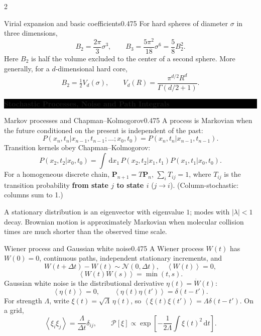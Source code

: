 \documentclass[8pt,a4paper]{extarticle}
\newcommand{\sectionbanner}[1]{%
  \par
  \Needspace{8\baselineskip}%
  \vspace{0.4ex}%
  \noindent
  \colorbox{black}{%
    \parbox{\dimexpr\linewidth-2\fboxsep\relax}{%
      \centering\color{white}\bfseries\footnotesize #1%
    }%
  }%
  \par\vspace{0.3ex}%
  \nopagebreak
}
\newcommand{\dd}{\,\mathrm d}
\newcommand{\avg}[1]{\left\langle #1\right\rangle}
\begin{document}
\begin{multicols*}{2}
\begin{mytikzbox}{Virial expansion and basic coefficients}{0.475}
For hard spheres of diameter \(\sigma\) in three dimensions, \[ B_2=\frac{2\pi}{3}\sigma^3, \qquad B_3=\frac{5\pi^2}{18}\sigma^6=\frac58B_2^2. \] Here \(B_2\) is half the volume excluded to the center of a second sphere. More generally, for a \(d\)-dimensional hard core, \[ B_2=\tfrac12V_d(\sigma), \qquad V_d(R)=\frac{\pi^{d/2}R^d}{\Gamma(d/2+1)}. \]
\end{mytikzbox}


\sectionbanner{Stochastic Processes, Noise and Path Integrals}
\begin{mytikzbox}{Markov processes and Chapman--Kolmogorov}{0.475}
A process is Markovian when the future conditioned on the present is independent
of the past:
\[
P(x_n,t_n|x_{n-1},t_{n-1};\ldots;x_0,t_0)
=P(x_n,t_n|x_{n-1},t_{n-1}).
\]
Transition kernels obey Chapman--Kolmogorov:
\[
P(x_2,t_2|x_0,t_0)=\int\dd x_1\,
P(x_2,t_2|x_1,t_1)P(x_1,t_1|x_0,t_0).
\]
For a homogeneous discrete chain, $\bm P_{n+1}=T\bm P_n$,
$\sum_iT_{ij}=1$, where $T_{ij}$ is the transition probability
\textbf{from state $j$ to state $i$} ($j\to i$).
(Column-stochastic: columns sum to 1.)

A stationary distribution is an eigenvector with eigenvalue
$1$; modes with $|\lambda|<1$ decay. Brownian motion is approximately Markovian
when molecular collision times are much shorter than the observed time scale.
\end{mytikzbox}

\begin{mytikzbox}{Wiener process and Gaussian white noise}{0.475}
A Wiener process $W(t)$ has $W(0)=0$, continuous paths, independent stationary
increments, and
\[
W(t+\Delta t)-W(t)\sim\mathcal N(0,\Delta t),
\quad \avg{W(t)}=0,
\]\[
\avg{W(t)W(s)}=\min(t,s).
\]
Gaussian white noise is the distributional derivative $\eta(t)=\dot W(t)$:
\[
\avg{\eta(t)}=0,
\qquad \avg{\eta(t)\eta(t')}=\delta(t-t').
\]
For strength $\Lambda$, write $\xi(t)=\sqrt\Lambda\,\eta(t)$, so
$\avg{\xi(t)\xi(t')}=\Lambda\delta(t-t')$. On a grid,
\[
\avg{\xi_i\xi_j}=\frac{\Lambda}{\Delta t}\delta_{ij},
\qquad
\mathcal P[\xi]\propto
\exp\!\left[-\frac1{2\Lambda}\int\xi(t)^2\dd t\right].
\]
\end{mytikzbox}


\end{multicols*}
\end{document}
